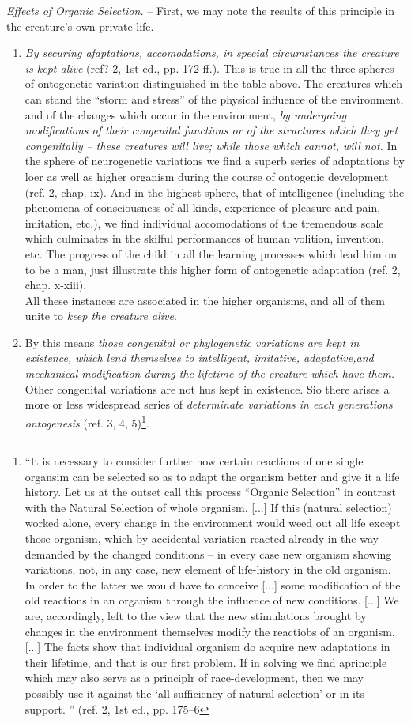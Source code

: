 \documentclass[11pt,twoside,a4paper]{article}
\begin{document}
\emph{Effects of Organic Selection. } -- First, we may note the results of this principle in the creature's own private life. 
\begin{enumerate}
	\item \emph{By securing afaptations, accomodations, in special circumstances the creature is kept alive} (ref? 2, 1st ed., pp. 172 ff.). This is true in all the three spheres of ontogenetic variation distinguished in the table above. The creatures which can stand the ``storm and stress'' of the physical influence of the environment, and of the changes which occur in the environment, \emph{by undergoing modifications of their congenital functions or of the structures which they get congenitally -- these creatures will live; while those which cannot, will not. } In the sphere of neurogenetic variations we find a superb series of adaptations by loer as well as higher organism during the course of ontogenic development (ref. 2, chap. ix). And in the highest sphere, that of intelligence (including the phenomena of consciousness of all kinds, experience of pleasure and pain, imitation, etc.), we find individual accomodations of the tremendous scale which culminates in the skilful performances of human volition, invention, etc. The progress of the child in all the learning processes which lead him on to be a man, just illustrate this higher form of ontogenetic adaptation (ref. 2, chap. x-xiii).~\\
	All these instances are associated in the higher organisms, and all of them unite to \emph{keep the creature alive}. 
	\item By this means \emph{those congenital or phylogenetic variations are kept in existence, which lend themselves to intelligent, imitative, adaptative,and mechanical modification during the lifetime of the creature which have them. } Other congenital variations are not hus kept in existence. Sio there arises a more or less widespread series of \emph{determinate variations in each generations ontogenesis} (ref. 3, 4, 5)\footnote{``It is necessary to consider further how certain reactions of one single organsim can be selected so as to adapt the organism better and give it a life history. Let us at the outset call this process ``Organic Selection'' in contrast with the Natural Selection of whole organism. [...] If this (natural selection) worked alone, every change in the environment would weed out all life except those organism, which by accidental variation reacted already in the way demanded by the changed conditions -- in every case new organism showing variations, not, in any case, new element of life-history in the old organism. In order to the latter we would have to conceive [...] some modification of the old reactions in an organism through the influence of new conditions. [...] We are, accordingly, left to the view that the new stimulations brought by changes in the environment themselves modify the reactiobs of an organism. [...] The facts show that  individual organism do acquire new adaptations in their lifetime, and that is our first problem. If in solving we find aprinciple which may also serve as a principlr of race-development, then we may possibly use it against the `all sufficiency of natural selection' or in its support. '' (ref. 2, 1st ed., pp. 175--6}.~\\

\end{enumerate}
\end{document}
